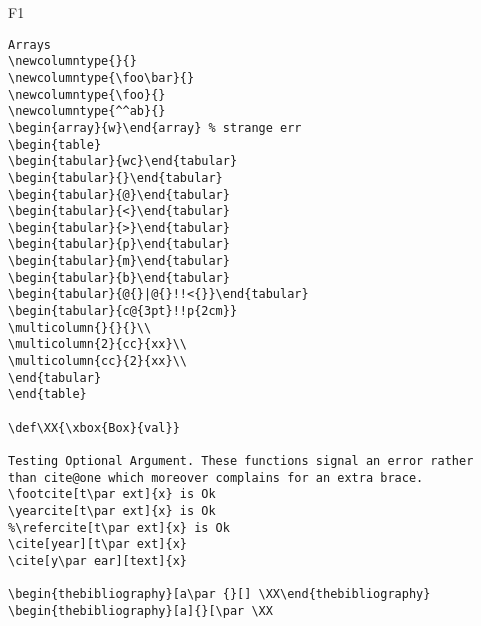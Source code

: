 \documentclass{article}
\begin{document}
\begin{filecontents+}{F1}
\begin{Verbatim}
Arrays
\newcolumntype{}{}
\newcolumntype{\foo\bar}{}
\newcolumntype{\foo}{}
\newcolumntype{^^ab}{}
\begin{array}{w}\end{array} % strange err
\begin{table}
\begin{tabular}{wc}\end{tabular}
\begin{tabular}{}\end{tabular}
\begin{tabular}{@}\end{tabular}
\begin{tabular}{<}\end{tabular}
\begin{tabular}{>}\end{tabular}
\begin{tabular}{p}\end{tabular}
\begin{tabular}{m}\end{tabular}
\begin{tabular}{b}\end{tabular}
\begin{tabular}{@{}|@{}!!<{}}\end{tabular}
\begin{tabular}{c@{3pt}!!p{2cm}}
\multicolumn{}{}{}\\
\multicolumn{2}{cc}{xx}\\
\multicolumn{cc}{2}{xx}\\
\end{tabular}
\end{table}

\def\XX{\xbox{Box}{val}}

Testing Optional Argument. These functions signal an error rather
than cite@one which moreover complains for an extra brace.
\footcite[t\par ext]{x} is Ok 
\yearcite[t\par ext]{x} is Ok
%\refercite[t\par ext]{x} is Ok
\cite[year][t\par ext]{x}
\cite[y\par ear][text]{x}

\begin{thebibliography}[a\par {}[] \XX\end{thebibliography}
\begin{thebibliography}[a]{}[\par \XX


\end{Verbatim}
\end{filecontents+}
\end{document}
